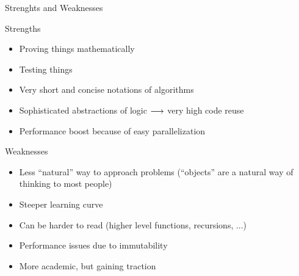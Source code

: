 \begin{frame}{Strenghts and Weaknesses}
\begin{block}{Strengths}
	\begin{itemize}
		\item Proving things mathematically
		\item Testing things
		\item Very short and concise notations of algorithms
		\item Sophisticated abstractions of logic $\longrightarrow$ very high code reuse
		\item Performance boost because of easy parallelization
	\end{itemize}
\end{block}

\begin{block}{Weaknesses}
	\begin{itemize}
		\item Less \enquote{natural} way to approach problems (\enquote{objects} are a natural way of thinking to most people)
		\item Steeper learning curve
		\item Can be harder to read (higher level functions, recursions, ...)
		\item Performance issues due to immutability
		\item More academic, but gaining traction 
	\end{itemize}
\end{block}

\end{frame}
